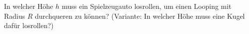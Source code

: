 \begin{Exercise}[label = Looping, origin = Maximilian Marienhagen, difficulty = 1, title = Looping]
In welcher Höhe $h$ muss ein Spielzeugauto losrollen, um einen Looping mit Radius $R$ durchqueren zu können? (Variante: In welcher Höhe muss eine Kugel dafür losrollen?) 
\end{Exercise}